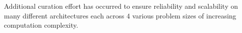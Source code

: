 \documentclass[../document.tex]{subfiles}
\begin{document}
\label{sec:extending_the_opendwarfs_benchmark_suite}

Additional curation effort has occurred to ensure reliability and scalability on many different architectures each across 4 various problem sizes of increasing computation complexity.
\end{document}
